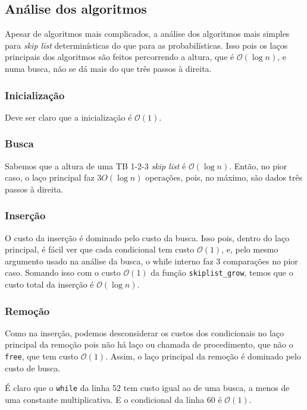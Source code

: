 \documentclass[paper=a4, fontsize=11pt]{scrartcl} %
\numberwithin{equation}{section}
\numberwithin{figure}{section}
\numberwithin{table}{section}
\numberwithin{definition}{section}
\numberwithin{theorem}{section}
\numberwithin{property}{section}
\numberwithin{proposition}{section}
\newcommand{\cO}{\ensuremath{\mathcal{O}}}
\renewcommand{\sl}{\textit{skip list}\xspace}
\begin{document}
\subsection{Análise dos algoritmos}

Apesar de algoritmos mais complicados, a análise dos algoritmos mais simples para \sl determinísticas
do que para as probabilísticas. Isso pois os laços principais dos algoritmos são feitos percorrendo
a altura, que é $\cO(\log n)$, e numa busca, não se dá mais do que três passos à direita.

\subsubsection{Inicialização}

Deve ser claro que a inicialização é $\cO(1)$.

\subsubsection{Busca}

Sabemos que a altura de uma TB 1-2-3 \sl é $\cO(\log n)$. Então, no pior caso, o laço principal faz
$3 O(\log n)$ operações, pois, no máximo, são dados três passos à direita.

\subsubsection{Inserção}

O custo da inserção é dominado pelo custo da busca. Isso pois, dentro do laço principal, é fácil
ver que cada condicional tem custo $\cO(1)$, e, pelo mesmo argumento usado na análise da busca, 
o while interno faz 3 comparações no pior caso. Somando isso com o custo $\cO(1)$ da função 
\verb|skiplist_grow|, temos que o custo total da inserção é $\cO(\log n)$.

\subsubsection{Remoção}

Como na inserção, podemos desconsiderar os custos dos condicionais no laço principal da remoção pois 
não há laço ou chamada de procedimento, que não o \verb|free|, que tem custo $\cO(1)$. Assim, o
laço principal da remoção é dominado pelo custo de busca.

É claro que o \verb|while| da linha 52 tem custo igual ao de uma busca, a menos de uma constante
multiplicativa. E o condicional da linha 60 é $\cO(1)$.
\end{document}
